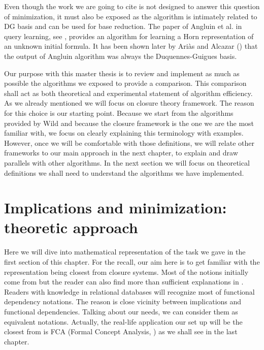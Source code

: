 \vspace{1.2em}

Even though the work we are going to cite is not designed to answer this 
question of minimization, it must also be exposed as the algorithm is 
intimately related to DG basis and can be used for base reduction. The paper
of Angluin et al. in query learning, see \cite{angluin_learning_1992}, provides
an algorithm for learning a Horn representation of an unknown initial formula. 
It has been shown later by Ariàs and Alcazar (\cite{arias_canonical_2009}) that
the output of Angluin algorithm was always the Duquennes-Guigues basis.

\vspace{1.2em}

Our purpose with this master thesis is to review and implement as much as 
possible the algorithms we exposed to provide a comparison. This comparison 
shall act as both theoretical and experimental statement of algorithm 
efficiency. As we already mentioned we will focus on closure theory framework.
The reason for this choice is our starting point. Because we start from the
algorithms provided by Wild and because the closure framework is the one we 
are the most familiar with, we focus on clearly explaining this terminology with
examples. However, once we will be comfortable with those definitions, we will 
relate other frameworks to our main approach in the next chapter, to explain and
draw parallels with other algorithms. In the next section we will focus on 
theoretical definitions we shall need to understand the algorithms we have 
implemented.



\section{Implications and minimization: theoretic approach}

Here we will dive into mathematical representation of the task we gave
in the first section of this chapter. For the recall, our aim here is to
get familiar with the representation being closest from closure systems.  Most 
of the notions initially come from \cite{guigues_familles_1986, 
ganter_two_2010, wild_theory_1994,	ganter_formal_1999} but the reader can 
also find more than sufficient explanations in \cite{ganter_conceptual_2016, 
wild_joy_2017}. Readers with knowledge in relational databases will recognize 
most of functional dependency notations. The reason is close vicinity between 
implications and functional dependencies. Talking about our needs, we can 
consider them as equivalent notations. Actually, the real-life application our 
set up will be the closest from is FCA (Formal Concept Analysis, \cite{ganter_formal_1999}) as we shall see in the last chapter.


